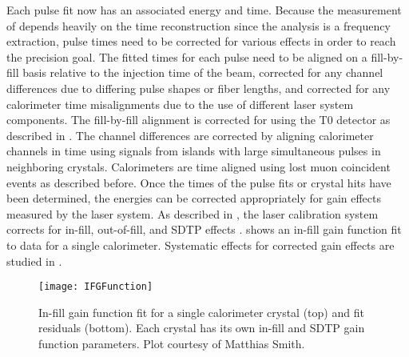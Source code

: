 Each pulse fit now has an associated energy and time. Because the measurement of \wa depends heavily on the time reconstruction since the analysis is a frequency extraction, pulse times need to be corrected for various effects in order to reach the precision goal. The fitted times for each pulse need to be aligned on a fill-by-fill basis relative to the injection time of the beam, corrected for any channel differences due to differing pulse shapes or fiber lengths, and corrected for any calorimeter time misalignments due to the use of different laser system components. The fill-by-fill alignment is corrected for using the T0 detector as described in . The channel differences are corrected by aligning calorimeter channels in time using signals from islands with large simultaneous pulses in neighboring crystals. Calorimeters are time aligned using lost muon coincident events as described before. Once the times of the pulse fits or crystal hits have been determined, the energies can be corrected appropriately for gain effects measured by the laser system. As described in , the laser calibration system corrects for in-fill, out-of-fill, and SDTP effects \cite{Gain}.  shows an in-fill gain function fit to data for a single calorimeter. Systematic effects for corrected gain effects are studied in . 

\begin{figure}[]
    \centering
    \texttt{[image: IFGFunction]}
    \caption[In-fill gain function fit for a single calorimeter crystal]{In-fill gain function fit for a single calorimeter crystal (top) and fit residuals (bottom). Each crystal has its own in-fill and SDTP gain function parameters. Plot courtesy of Matthias Smith.}
    \label{fig:IFGFunction}
\end{figure}


